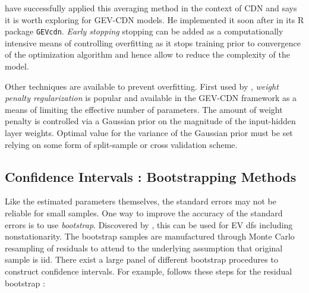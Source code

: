  
\citet{Carney_2005} have successfully applied this averaging method in the context of CDN and \citet{cannon_flexible_2010} says it is worth exploring for GEV-CDN models. He implemented it soon after in its R package \texttt{GEVcdn}. \emph{Early stopping} stopping can be added as a computationally intensive means of controlling overfitting as it stops training prior to convergence of the optimization algorithm and hence allow to reduce the complexity of the model.

Other techniques are available to prevent overfitting. First used by \citet{mackay92b}, \emph{weight penalty regularization} is popular and available in the GEV-CDN framework as a means of limiting the effective number of parameters. The amount of weight penalty is
controlled via a Gaussian prior on the magnitude of the input-hidden layer weights. Optimal value for the
variance of the Gaussian prior must be set relying on some form of split-sample or cross validation scheme.



\subsection{Confidence Intervals : Bootstrapping Methods}

Like the estimated parameters themselves, the standard errors may not be reliable for small samples. One way to improve the accuracy of the standard errors is to use \emph{bootstrap}. Discovered by \citet{efron1979}, this can be used for EV dfs including nonstationarity. The bootstrap samples are manufactured through
Monte Carlo resampling of residuals to attend to the underlying assumption  that original sample is iid.
There exist a large panel of different bootstrap procedures to construct confidence intervals.  For example, \citet{2006JHyd..329..534K} follows these steps for the residual bootstrap : 
 
